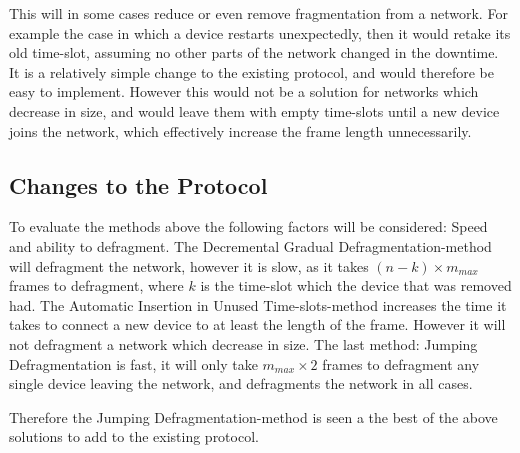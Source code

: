 
\bigskip

This will in some cases reduce or even remove fragmentation from a network. 
For example the case in which a device restarts unexpectedly, then it would retake its old time-slot, assuming no other parts of the network changed in the downtime.
It is a relatively simple change to the existing protocol, and would therefore be easy to implement. 
However this would not be a solution for networks which decrease in size, and would leave them with empty time-slots until a new device joins the network, which effectively increase the frame length unnecessarily.

\subsection{Changes to the Protocol}
To evaluate the methods above the following factors will be considered: Speed and ability to defragment.
The Decremental Gradual Defragmentation-method will defragment the network, however it is slow, as it takes $(n - k) \times m_{max}$ frames to defragment, where $k$ is the time-slot which the device  that was removed had. 
The Automatic Insertion in Unused Time-slots-method increases the time it takes to connect a new device to at least the length of the frame. 
However it will not defragment a network which decrease in size. 
The last method: Jumping Defragmentation is fast, it will only take $m_{max} \times 2$ frames to defragment any single device leaving the network, and defragments the network in all cases. 

Therefore the Jumping Defragmentation-method is seen a the best of the above solutions to add to the existing protocol. 

